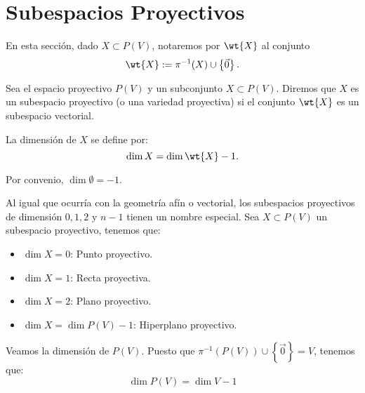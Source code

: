 \section{Subespacios Proyectivos}

En esta sección, dado $X\subset P(V)$, notaremos por $\wt{X}$ al conjunto $$\wt{X}:=\pi^{-1}(X)\cup \left\{\vec{0}\right\}.$$

\begin{definicion}
    Sea el espacio proyectivo $P(V)$ y un subconjunto $X\subset P(V)$. Diremos que $X$ es un subespacio proyectivo (o una variedad proyectiva) si el conjunto 
    $\wt{X}$ es un subespacio vectorial.

    La dimensión de $X$ se define por:
    $$\dim X = \dim \wt{X}-1.$$
\end{definicion}

\begin{observacion}
    Por convenio, $\dim \emptyset = -1$.
\end{observacion}

Al igual que ocurría con la geometría afín o vectorial, los subespacios proyectivos de dimensión $0,1,2$ y $n-1$ tienen un nombre especial. Sea $X\subset P(V)$ un subespacio proyectivo, tenemos que:
\begin{itemize}
    \item $\dim X=0$: Punto proyectivo.
    \item $\dim X=1$: Recta proyectiva.
    \item $\dim X=2$: Plano proyectivo.
    \item $\dim X=\dim P(V)-1$: Hiperplano proyectivo.
\end{itemize}

Veamos la dimensión de $P(V)$. Puesto que $\pi^{-1}(P(V))\cup \left\{\vec{0}\right\} = V$, tenemos que:
\begin{equation*}
    \dim P(V) = \dim V - 1
\end{equation*}

